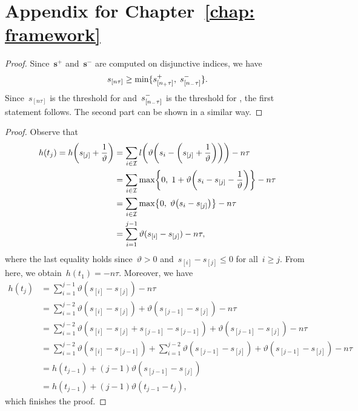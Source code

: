 \chapter{Appendix for Chapter~\ref{chap: framework}}\label{app: framework}

\lemmattcomparison*
\begin{proof}
  Since~$\bm{s}^+$ and~$\bm{s}^-$ are computed on disjunctive indices, we have
  \begin{equation*}
    s_{[n\tau]} \geq \min\{s_{[n_{+}\tau]}^+, \; s_{[n_{-}\tau]}^-\}.
  \end{equation*}
  Since~$s_{[n\tau]}$ is the threshold for \Grill and~$s_{[n_{-}\tau]}^-$ is the threshold for \GrillNP, the first statement follows. The second part can be shown in a similar way.
\end{proof}

\lemmapatmatalg*
\begin{proof}
  Observe that
  \begin{align*}
    h(t_{j})
      = h\Brac{s_{[j]}+\frac{1}{\vartheta}}
      & = \sum_{i \in \I} l\Brac{\vartheta\Brac{s_i - \Brac{s_{[j]} + \frac{1}{\vartheta}}}} - n\tau \\
      & = \sum_{i \in \I} \max\Brac[c]{0,\; 1 + \vartheta\Brac{s_i - s_{[j]} - \frac{1}{\vartheta}}} - n\tau \\
      & = \sum_{i \in \I} \max\Brac[c]{0,\; \vartheta \Brac{s_i - s_{[j]}}} - n\tau \\
      & = \sum_{i = 1}^{j - 1} \vartheta(s_{[i]} - s_{[j]}) - n\tau,
  \end{align*}
  where the last equality holds since~$\vartheta > 0$ and~$s_{[i]} - s_{[j]} \leq 0$ for all~$i \geq j.$ From here, we obtain~$h(t_{1}) = -n\tau$. Moreover, we have
  \begin{align*}
    h(t_{j})
    & = \sum_{i = 1}^{j - 1} \vartheta(s_{[i]} - s_{[j]}) - n\tau \\
    & = \sum_{i = 1}^{j - 2} \vartheta(s_{[i]} - s_{[j]}) + \vartheta(s_{[j-1]} - s_{[j]}) - n\tau \\
    & = \sum_{i = 1}^{j - 2} \vartheta(s_{[i]} - s_{[j]} + s_{[j - 1]} - s_{[j - 1]}) + \vartheta(s_{[j-1]} - s_{[j]}) - n\tau \\
    & = \sum_{i = 1}^{j - 2} \vartheta(s_{[i]} - s_{[j - 1]}) + \sum_{i = 1}^{j - 2} \vartheta(s_{[j - 1]} - s_{[j]}) + \vartheta(s_{[j - 1]} - s_{[j]}) - n\tau \\
    & = h(t_{j - 1}) + (j - 1) \vartheta(s_{[j - 1]} - s_{[j]}) \\
    & = h(t_{j - 1}) + (j - 1) \vartheta(t_{j - 1} - t_{j}),
  \end{align*}
  which finishes the proof.
\end{proof}
